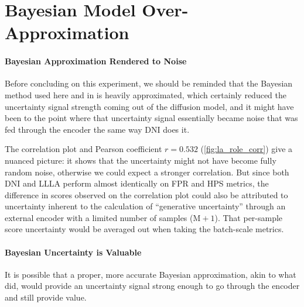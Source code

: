 \section{Bayesian Model Over-Approximation}
\label{sec:bayesian-model-over-approx}

\paragraph{Bayesian Approximation Rendered to Noise}
Before concluding on this experiment, we should be reminded that the Bayesian method used here and in \cite{jazbec_generative_2025} is heavily approximated, which certainly reduced the uncertainty signal strength coming out of the diffusion model, and it might have been to the point where that uncertainty signal essentially became noise that was fed through the encoder the same way \acs{DNI} does it. 

The correlation plot and Pearson coefficient $r=0.532$ (\autoref{fig:la_role_corr}) give a nuanced picture: it shows that the uncertainty might not have become fully random noise, otherwise we could expect a stronger correlation. But since both \acs{DNI} and \acs{LLLA} perform almost identically on \acs{FPR} and \acs{HPS} metrics, the difference in scores observed on the correlation plot could also be attributed to uncertainty inherent to the calculation of ``generative uncertainty'' through an external encoder with a limited number of samples ($\mathrm{M}+1$). That per-sample score uncertainty would be averaged out when taking the batch-scale metrics.

\paragraph{Bayesian Uncertainty is Valuable}
It is possible that a proper, more accurate Bayesian approximation, akin to what \cite{gegenfurtner_reducing_2026} did, would provide an uncertainty signal strong enough to go through the encoder and still provide value.

